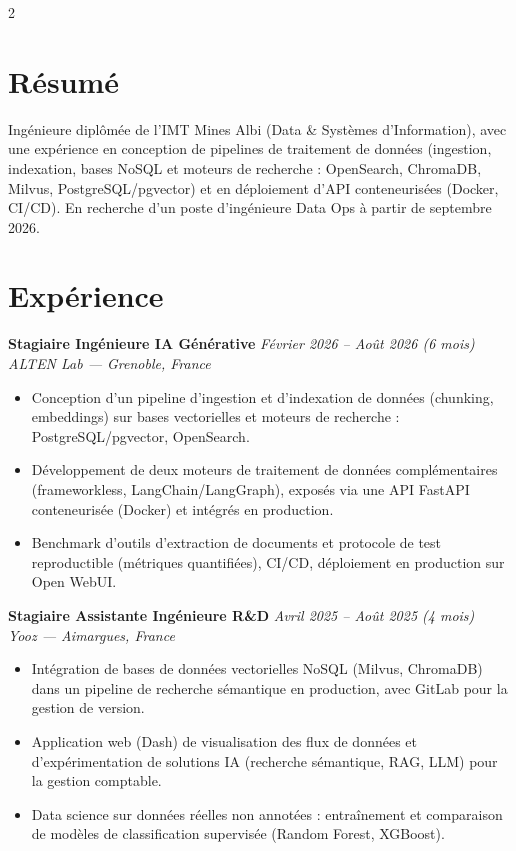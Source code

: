 \documentclass[10.5pt,a4paper]{article}
\newcommand{\sectionrule}{\vspace{-6pt}{\color{accent}\hrule height 1pt}\vspace{2pt}}
\newcommand{\cvexp}[5]{%
  \noindent\textbf{#1} \hfill {\itshape\color{graytext}\small #4}\\
  {\itshape #2 --- #3}\\[-2pt]
  #5
  \vspace{5pt}
}
\begin{document}
\setlength{\columnsep}{1.5em}
\begin{paracol}{2}

\section*{Résumé}
\sectionrule
\justifying
Ingénieure diplômée de l'IMT Mines Albi (Data \& Systèmes d'Information), avec une expérience en conception de pipelines de traitement de données (ingestion, indexation, bases NoSQL et moteurs de recherche : OpenSearch, ChromaDB, Milvus, PostgreSQL/pgvector) et en déploiement d'API conteneurisées (Docker, CI/CD). En recherche d'un poste d'ingénieure Data Ops à partir de septembre 2026.

\section*{Expérience}
\sectionrule

\cvexp{Stagiaire Ingénieure IA Générative}{ALTEN Lab}{Grenoble, France}{Février 2026 -- Août 2026 (6 mois)}{%
  \begin{itemize}[leftmargin=12pt, itemsep=2pt, topsep=0pt, partopsep=0pt, parsep=0pt]
    \item Conception d'un pipeline d'ingestion et d'indexation de données (chunking, embeddings) sur bases vectorielles et moteurs de recherche : PostgreSQL/\allowbreak pgvector, OpenSearch.
    \item Développement de deux moteurs de traitement de données complémentaires (frameworkless, LangChain/\allowbreak LangGraph), exposés via une API FastAPI conteneurisée (Docker) et intégrés en production.
    \item Benchmark d'outils d'extraction de documents et protocole de test reproductible (métriques quantifiées), CI/CD, déploiement en production sur Open WebUI.
  \end{itemize}
}

\cvexp{Stagiaire Assistante Ingénieure R\&D}{Yooz}{Aimargues, France}{Avril 2025 -- Août 2025 (4 mois)}{%
  \begin{itemize}[leftmargin=12pt, itemsep=2pt, topsep=0pt, partopsep=0pt, parsep=0pt]
    \item Intégration de bases de données vectorielles NoSQL (Milvus, ChromaDB) dans un pipeline de recherche sémantique en production, avec GitLab pour la gestion de version.
    \item Application web (Dash) de visualisation des flux de données et d'expérimentation de solutions IA (recherche sémantique, RAG, LLM) pour la gestion comptable.
    \item Data science sur données réelles non annotées : entraînement et comparaison de modèles de classification supervisée (Random Forest, XGBoost).
  \end{itemize}
}


\end{paracol}
\end{document}
